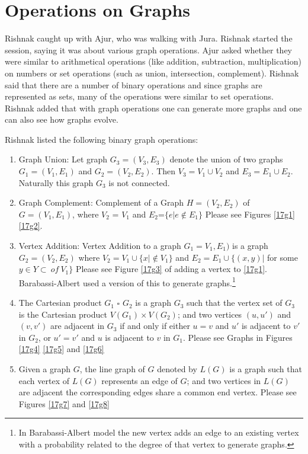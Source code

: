 \chapter{Operations on Graphs}

Rishnak caught up with Ajur, who was walking with Jura. Rishnak started the session, saying it was about various graph operations.
Ajur asked whether they were similar to arithmetical operations (like addition, subtraction, multiplication) on numbers or set operations (such as union, intersection, complement). Rishnak said that there are a number of binary operations and since graphs are represented as sets, many of the operations were similar to set operations. Rishnak added that with graph operations one can generate more graphs and one can also see how graphs evolve.

Rishnak listed the following binary graph operations:
\begin{enumerate}
    \item Graph Union: Let graph $G_3=(V_3,E_3)$ denote the union of two graphs $G_1=(V_1,E_1)$ and $G_2=(V_2,E_2)$. Then $V_3= V_1 \cup V_2$ and
    $E_3=E_1\cup E_2$. Naturally this graph $G_3$ is not connected.
    \item Graph Complement: Complement of a Graph $H=(V_2,E_2)$ of $G=(V_1,E_1)$, where $V_2$ = $V_1$ and $E_2$=$\{e| e \notin E_1\}$ Please see Figures \ref{17g1} \ref{17g2}.
    \item Vertex Addition: Vertex Addition to a graph $G_1=V_1,E_1)$ is a graph $G_2=(V_2,E_2)$  where $V_2=V_1 \cup \{x| \notin V_1\}$ and $E_2=E_1 \cup \{(x,y)  |$ for some  $y  \in Y \subset~ of~ V_1\}$ Please see Figure \ref{17g3} of adding a vertex to \ref{17g1}. Barabassi-Albert used a version of this to generate graphs.\footnote {In Barabassi-Albert model the new vertex adds an edge to an existing vertex with a probability related to the degree of that vertex to generate graphs.}
    \item  The Cartesian product $G_1$ $ \square $  $G_2$ is a graph $G_3$ such that
the vertex set of $G_3$  is the Cartesian product $V(G_1) × V(G_2)$; and
two vertices $(u,u' )$ and $(v,v' )$ are adjacent in $G_3$ if and only if either
$u = v$ and $u'$ is adjacent to $v'$ in $G_2$, or
$u' = v'$ and $u$ is adjacent to $v$ in $G_1$. Please see Graphs in Figures \ref{17g4} \ref{17g5} and \ref{17g6}
\item Given a graph $G$, the line graph  of $G$ denoted by $L(G)$ is a graph such that
each vertex of $L(G)$ represents an edge of $G$; and
two vertices in $L(G)$ are adjacent the corresponding edges share a common end vertex. Please see Figures \ref{17g7} and \ref{17g8}
\end{enumerate}
